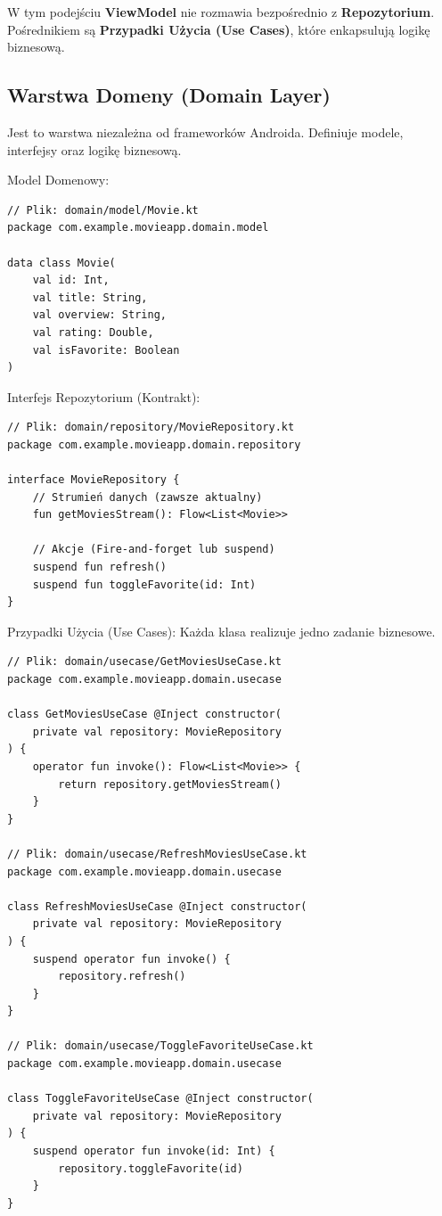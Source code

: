 W tym podejściu \textbf{ViewModel} nie rozmawia bezpośrednio z \textbf{Repozytorium}. Pośrednikiem są \textbf{Przypadki Użycia (Use Cases)}, które enkapsulują logikę biznesową.

\subsection{Warstwa Domeny (Domain Layer)}

Jest to warstwa niezależna od frameworków Androida. Definiuje modele, interfejsy oraz logikę biznesową.

Model Domenowy:
\begin{verbatim}
// Plik: domain/model/Movie.kt
package com.example.movieapp.domain.model

data class Movie(
    val id: Int,
    val title: String,
    val overview: String,
    val rating: Double,
    val isFavorite: Boolean
)
\end{verbatim}

Interfejs Repozytorium (Kontrakt):
\begin{verbatim}
// Plik: domain/repository/MovieRepository.kt
package com.example.movieapp.domain.repository

interface MovieRepository {
    // Strumień danych (zawsze aktualny)
    fun getMoviesStream(): Flow<List<Movie>>
    
    // Akcje (Fire-and-forget lub suspend)
    suspend fun refresh()
    suspend fun toggleFavorite(id: Int)
}
\end{verbatim}

Przypadki Użycia (Use Cases):
Każda klasa realizuje jedno zadanie biznesowe.

\begin{verbatim}
// Plik: domain/usecase/GetMoviesUseCase.kt
package com.example.movieapp.domain.usecase

class GetMoviesUseCase @Inject constructor(
    private val repository: MovieRepository
) {
    operator fun invoke(): Flow<List<Movie>> {
        return repository.getMoviesStream()
    }
}

// Plik: domain/usecase/RefreshMoviesUseCase.kt
package com.example.movieapp.domain.usecase

class RefreshMoviesUseCase @Inject constructor(
    private val repository: MovieRepository
) {
    suspend operator fun invoke() {
        repository.refresh()
    }
}

// Plik: domain/usecase/ToggleFavoriteUseCase.kt
package com.example.movieapp.domain.usecase

class ToggleFavoriteUseCase @Inject constructor(
    private val repository: MovieRepository
) {
    suspend operator fun invoke(id: Int) {
        repository.toggleFavorite(id)
    }
}
\end{verbatim}

